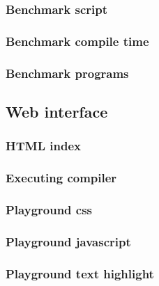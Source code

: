 \subsubsection{Benchmark script}


\subsubsection{Benchmark compile time}


\subsubsection{Benchmark programs} \label{sec:benchmark-programs}




\subsection{Web interface}

\subsubsection{HTML index}


\subsubsection{Executing compiler}


\subsubsection{Playground css}


\subsubsection{Playground javascript}


\subsubsection{Playground text highlight}

